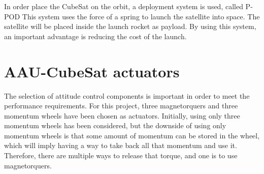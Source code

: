 In order place the CubeSat on the orbit, a deployment system is used, called P-POD  This system uses the force of a spring to launch the satellite into space. The satellite will be placed inside the launch rocket as payload. By using this system, an important advantage is reducing the cost of the launch.
%
\section{AAU-CubeSat actuators}
The selection of attitude control components is important in order to meet the performance requirements. For this project, three magnetorquers and three momentum wheels have been chosen as actuators. Initially, using only three momentum wheels has been considered, but the downside of using only momentum wheels is that some amount of momentum can be stored in the wheel, which will imply having a way to take back all that momentum and use it. Therefore, there are multiple ways to release that torque, and one is to use magnetorquers. 


